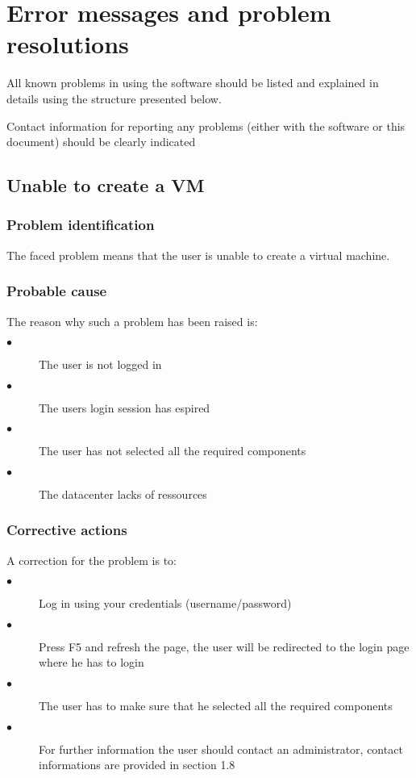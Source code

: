 
\chapter{Error messages and problem resolutions}
\label{chap:error_messages}

All known problems in using the software should be listed and explained in
details using the structure presented below.

Contact information for reporting any problems (either with the software or
this document) should be clearly indicated


\section{Unable to create a VM}

\subsection{Problem identification}
The faced problem means that the user is unable to create a virtual machine.

\subsection{Probable cause}

The reason why such a problem has been raised is:\\
\begin{description}
  \item[$\bullet$] The user is not logged in
  \item[$\bullet$] The users login session has espired
  \item[$\bullet$] The user has not selected all the required components
  \item[$\bullet$] The datacenter lacks of ressources
\end{description}


\subsection{Corrective actions}

A correction for the problem is to:\\
\begin{description}
  \item[$\bullet$] Log in using your credentials (username/password)
  \item[$\bullet$] Press F5 and refresh the page, the user will be redirected to
  the login page where he has to login
  \item[$\bullet$] The user has to make sure that he selected all the required
  components
  \item[$\bullet$] For further information the user should contact an
  administrator, contact informations are provided in section 1.8
\end{description}


